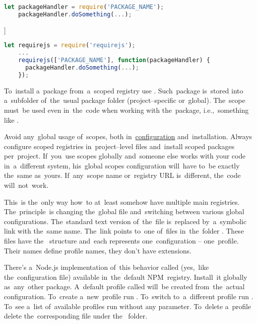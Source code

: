 \begin{lstlisting}[language=JavaScript]
    let packageHandler = require('PACKAGE_NAME');
    packageHandler.doSomething(...);
\end{lstlisting}

\example[loading package with \hyperref[requirejs]{\textit{RequireJS}}]
\begin{lstlisting}[language=JavaScript]
    let requirejs = require('requirejs');
    ...
    requirejs(['PACKAGE_NAME'], function(packageHandler) {
      packageHandler.doSomething(...);
    });
\end{lstlisting}

\label{nsmscopedpackages}
To~install a~package from~a~scoped registry use .
Such~package is~stored into a~subfolder  of~the~usual package folder (project--specific or~global).
The~scope must~be used even in~the~code when working with the~package, i.e.,~something like .

\warning Avoid any~global usage of~scopes, both in~\hyperref[npmconfig]{configuration} and~installation.
Always configure scoped registries in~project--level  files and~install scoped packages per~project.
If~you~use scopes globally and~someone else works with your code in~a~different system, his~global scopes configuration will~have to~be exactly the~same as~yours.
If~any~scope name or~registry URL is~different, the~code will~not~work.

\enlargethispage{10mm}
\thispagestyle{empty}
\label{npmprofile}
This~is the~only way how~to at~least somehow have multiple main registries.
The~principle~is changing the~global  file and~switching between various global configurations.
The~standard text version of~the~file is~replaced by~a~symbolic link with the~same name.
The~link points to~one of~files in~the~folder .
These files have the~ structure and~each represents one~configuration -- one~profile.
Their names define profile names, they don't have extensions.

There's a~Node.js implementation of~this behavior called  (yes,~like the~configuration file) available in~the~default NPM~registry.
Install~it globally as~any~other package.
A~default profile called  will~be created from~the~actual configuration.
To~create a~new~profile run .
To~switch to~a~different profile run .
To~see a~list of~available profiles run  without any parameter.
To~delete a~profile delete the~corresponding file under the~ folder.
\newpage

